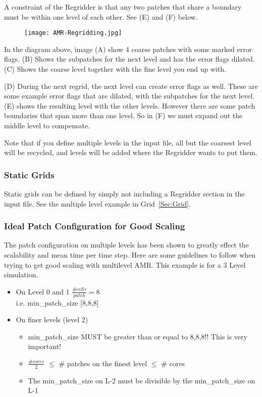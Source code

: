 A constraint of the Regridder is that any two patches that share a boundary must be within one level of each other. See (E) and (F) below.


\begin{figure}[H]
  \centering
  \texttt{[image: AMR-Regridding.jpg]}
  \caption{}
  \label{}
\end{figure}

In the diagram above, image (A) show 4 coarse patches with some marked
error flags. (B) Shows the subpatches for the next level and has the
error flags dilated. (C) Shows the coarse level together with the fine
level you end up with.

(D) During the next regrid, the next level can create error flags as
well. These are some example error flags that are dilated, with the
subpatches for the next level. (E) shows the resulting level with the
other levels. However there are some patch boundaries that span more
than one level. So in (F) we must expand out the middle level to
compensate.

Note that if you define multiple levels in the input file, all but
the coarsest level will be recycled, and levels will be added where
the Regridder wants to put them.

\subsubsection{Static Grids}

Static grids can be defined by simply not including a Regridder
section in the input file. See the multiple level example in
Grid~\ref{Sec:Grid}.

\subsubsection{Ideal Patch Configuration for Good Scaling}
The patch configuration on multiple levels has been shown to greatly
effect the scalability and mean time per time step.
Here are some guidelines to follow when trying to get good scaling with multilevel AMR.
This example is for a 3 Level simulation.
\begin{itemize}
\item On Level 0 and 1 $\frac{\# cells}{patch} = 8$ \\
	i.e. min\_patch\_size [8,8,8]
\item On finer levels (level 2)
\begin{itemize}
	\item min\_patch\_size MUST be greater than or equal to 8,8,8!! This is very important!
	\item $\frac{\# cores}{2} $ $\leq$ $\#$ patches on the finest level $\leq$ $\#$ cores
	\item The min\_patch\_size on L-2 must be divisible by the min\_patch\_size on L-1
\end{itemize}
\end{itemize}

